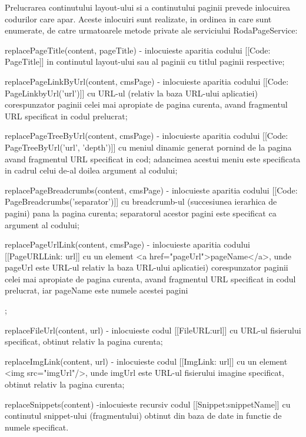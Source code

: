\bigskip

Prelucrarea continutului layout-ului si a continutului paginii prevede inlocuirea codurilor care apar. Aceste inlocuiri sunt realizate, in ordinea in care sunt enumerate, de catre urmatoarele metode private ale serviciului RodaPageService:
\begin{itemize}
\item{replacePageTitle(content, pageTitle) - inlocuieste aparitia codului [[Code: PageTitle]] in continutul layout-ului sau al paginii cu titlul paginii respective;}
\item{replacePageLinkByUrl(content, cmsPage) - inlocuieste aparitia codului [[Code: PageLinkbyUrl('url')]] cu URL-ul (relativ la baza URL-ului aplicatiei) corespunzator paginii celei mai apropiate de pagina curenta, avand fragmentul URL specificat in codul prelucrat;} 
\item{replacePageTreeByUrl(content, cmsPage) - inlocuieste aparitia codului [[Code: PageTreeByUrl('url', 'depth')]] cu meniul dinamic generat pornind de la pagina avand fragmentul URL specificat in cod; adancimea acestui meniu este specificata in cadrul celui de-al doilea argument al codului;
\item{replacePageBreadcrumbs(content, cmsPage) - inlocuieste aparitia codului [[Code: PageBreadcrumbs('separator')]]} cu breadcrumb-ul (succesiunea ierarhica de pagini) pana la pagina curenta; separatorul acestor pagini este specificat ca argument al codului;
\item{replacePageUrlLink(content, cmsPage)}  - inlocuieste aparitia codului [[PageURLLink: url]] cu un element <a href="pageUrl">pageName</a>, unde pageUrl este URL-ul relativ la baza URL-ului aplicatiei) corespunzator paginii celei mai apropiate de pagina curenta, avand fragmentul URL specificat in codul prelucrat, iar pageName este numele acestei pagini};
\item{replaceFileUrl(content, url) - inlocuieste codul [[FileURL:url]] cu URL-ul fisierului specificat, obtinut relativ la pagina curenta;}
\item{replaceImgLink(content, url) - inlocuieste codul [[ImgLink: url]] cu un element <img src="imgUrl"/>, unde imgUrl este URL-ul fisierului imagine specificat, obtinut relativ la pagina curenta;}
\item{replaceSnippets(content) -inlocuieste recursiv codul [[Snippet:snippetName]] cu continutul snippet-ului (fragmentului) obtinut din baza de date in functie de numele specificat.}
\end{itemize}

\bigskip


